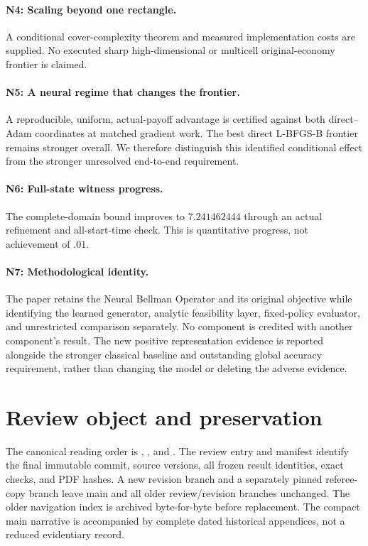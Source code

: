 \paragraph{N4: Scaling beyond one rectangle.}
A conditional cover-complexity theorem and measured implementation costs are supplied. No executed sharp high-dimensional or multicell original-economy frontier is claimed.
\paragraph{N5: A neural regime that changes the frontier.}
A reproducible, uniform, actual-payoff advantage is certified against both direct--Adam coordinates at matched gradient work. The best direct L-BFGS-B frontier remains stronger overall. We therefore distinguish this identified conditional effect from the stronger unresolved end-to-end requirement.
\paragraph{N6: Full-state witness progress.}
The complete-domain bound improves to $7.241462444$ through an actual refinement and all-start-time check. This is quantitative progress, not achievement of $.01$.
\paragraph{N7: Methodological identity.}
The paper retains the Neural Bellman Operator and its original objective while identifying the learned generator, analytic feasibility layer, fixed-policy evaluator, and unrestricted comparison separately. No component is credited with another component's result. The new positive representation evidence is reported alongside the stronger classical baseline and outstanding global accuracy requirement, rather than changing the model or deleting the adverse evidence.

\section{Review object and preservation}
The canonical reading order is , , and . The review entry and manifest identify the final immutable commit, source versions, all frozen result identities, exact checks, and PDF hashes. A new revision branch and a separately pinned referee-copy branch leave main and all older review/revision branches unchanged. The older navigation index is archived byte-for-byte before replacement. The compact main narrative is accompanied by complete dated historical appendices, not a reduced evidentiary record.
